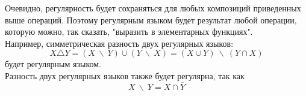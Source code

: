 Очевидно, регулярность будет сохраняться для любых композиций приведенных выше операций. Поэтому регулярным языком будет результат любой операции, которую можно, так сказать, "выразить в элементарных функциях". \\
Например, симметрическая разность двух регулярных языков:
$$X \triangle Y = (X \ \backslash \ Y) \cup (Y \ \backslash \ X) = (X \cup Y) \ \backslash \ (Y \cap X)$$
будет регулярным языком. \\
Разность двух регулярных языков также будет регулярна, так как
$$X \ \backslash \ Y = X \cap \overline{Y}$$

